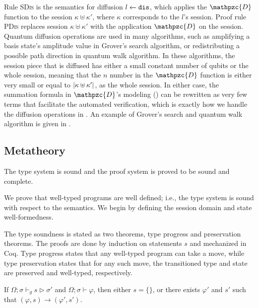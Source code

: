 Rule \textsc{SDis} is the semantics for diffusion ${l} \xleftarrow{} {\texttt{dis}}$, which applies the $\mathpzc{D}$ function to the session $\kappa \uplus \kappa'$, where $\kappa$ corresponds to the $l$'s session. Proof rule \textsc{PDis} replaces session $\kappa\uplus \kappa'$ with the application $\mathpzc{D}$ on the session.
Quantum diffusion operations are used in many algorithms, such as amplifying a basis state's amplitude value in Grover's search algorithm, or redistributing a possible path direction in quantum walk algorithm.
In these algorithms, the session piece that is diffused has either a small constant number of qubits or the whole session, meaning that the $n$ number in the $\mathpzc{D}$ function is either very small or equal to $|\kappa \uplus \kappa'|$, as the whole session.
In either case, the summation formula in $\mathpzc{D}$'s modeling () can be rewritten as very few terms that facilitate the automated verification, which is exactly how we handle the diffusion operations in \qafny.
An example of Grover's search and quantum walk algorithm is given in .

\subsection{\qafny Metatheory}\label{sec:theorems}

The type system is sound and the proof system is proved to be sound and complete.


We prove that well-typed \qafny programs are well defined; i.e., the
type system is sound with respect to the semantics. 
We begin by defining the session domain and state well-formedness.





The \qafny type soundness is stated as two theorems, type progress and preservation theorems. The proofs are done by induction on \qafny statements $s$ and mechanized in Coq. Type progress states that any well-typed \qafny program can take a move, while type preservation states that for any such move, the transitioned type and state are preserved and well-typed, respectively.

\begin{theorem}\label{thm:type-progress-oqasm}\rm 
If $\Omega;\sigma \vdash_g s \triangleright \sigma'$ and $\Omega;\sigma \vdash \varphi$, then either $s=\{\}$, or there exists $\varphi'$ and $s'$ such that $(\varphi,s)\longrightarrow (\varphi',s')$.
\end{theorem}


